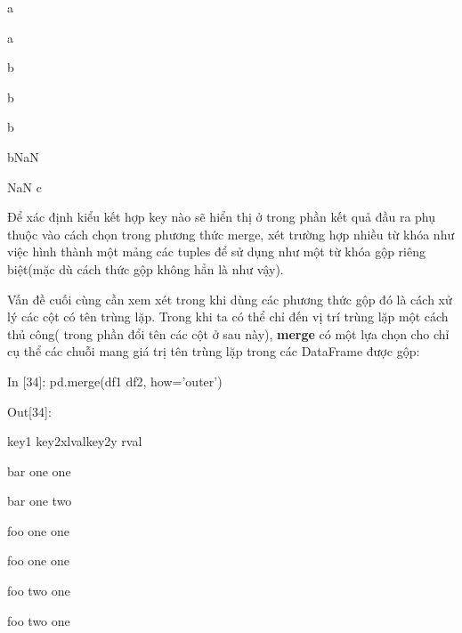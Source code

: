      \quad{} \quad a \quad{}\par
     \quad{} \quad a \quad{}\par
     \quad{} \quad b \quad{}\par
     \quad{} \quad b \quad{}\par
     \quad{} \quad b \quad{}\par
     \quad{} \quad b\quad NaN\par
    \quad NaN \quad c \quad{} \par
Để xác định kiểu kết hợp key nào sẽ hiển thị ở trong phần kết quả đầu ra phụ thuộc vào cách chọn trong phương thức merge, xét trường hợp nhiều từ khóa như việc hình thành một mảng các tuples để sử dụng như một từ khóa gộp riêng biệt(mặc dù cách thức gộp không hẳn là như vậy). \par
Vấn đề cuối cùng cần xem xét trong khi dùng các phương thức gộp đó là cách xử lý các cột có tên trùng lặp. Trong khi ta có thể chỉ đến vị trí trùng lặp một cách thủ công( trong phần đổi tên các cột ở sau này), \textbf{merge} có một lựa chọn cho chỉ cụ thể các chuỗi mang giá trị tên trùng lặp trong các DataFrame được gộp: \par
    \quad\textup{In [34]: pd.merge(df1 df2, how='outer')}\par
    \quad\textup{Out[34]:}\par
    \quad\quad\textup{ key1 key2x\quad lval\quad key2y \quad rval } \par
     \quad bar \quad one \quad {} \quad one \quad {} \par
     \quad bar \quad one \quad {} \quad two \quad {} \par
     \quad foo \quad one \quad {} \quad one \quad {} \par
     \quad foo \quad one \quad {} \quad one \quad {} \par
     \quad foo \quad two \quad {} \quad one \quad {} \par
     \quad foo \quad two \quad {} \quad one \quad {} \par

